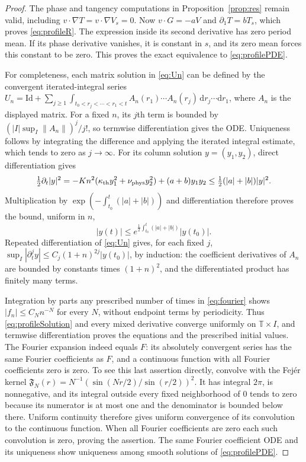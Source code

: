 \documentclass[11pt]{article}
\newcommand{\T}{\mathbb T}
\newcommand{\dd}{\mathrm d}
\newcommand{\thd}{\kappa_{\rm th}}
\newcommand{\vis}{\nu_{\rm phys}}
\begin{document}
\begin{proof}
The phase and tangency computations in Proposition~\ref{prop:res} remain
valid, including $v\cdot\nabla T=v\cdot\nabla V_s=0$.
Now $v\cdot G=-aV$ and $\partial_1T=bT_s$, which proves
\eqref{eq:profileR}. The expression inside its second derivative has zero
period mean. If its phase derivative vanishes, it is constant in $s$,
and its zero mean forces this constant to be zero. This proves the exact
equivalence to \eqref{eq:profilePDE}.

For completeness, each matrix solution in \eqref{eq:Un} can be defined by
the convergent iterated-integral series
$U_n=\mathrm{Id}+\sum_{j\geq1}\int_{t_0<r_j<\cdots<r_1<t}
 A_n(r_1)\cdots A_n(r_j)\,\dd r_j\cdots\dd r_1$, where $A_n$ is the
displayed matrix. For a fixed $n$, its $j$th term is bounded by
$(|I|\sup_I\|A_n\|)^j/j!$, so termwise differentiation gives the ODE.
Uniqueness follows by integrating the difference and applying the
iterated integral estimate, which tends to zero as $j\to\infty$.
For its column solution $y=(y_1,y_2)$, direct differentiation gives
\[
 \tfrac12\partial_t|y|^2
 =-Kn^2(\thd y_1^2+\vis y_2^2)+(a+b)y_1y_2
 \leq \tfrac12(|a|+|b|)|y|^2.
\]
Multiplication by $\exp(-\int_{t_0}^t(|a|+|b|))$ and differentiation
therefore proves the bound, uniform in $n$,
\[
 |y(t)|\leq e^{\frac12\int_{t_0}^t(|a|+|b|)}|y(t_0)|.
\]
Repeated differentiation of \eqref{eq:Un} gives, for each fixed $j$,
$\sup_I|\partial_t^j y|\leq C_j(1+n)^{2j}|y(t_0)|$, by induction:
the coefficient derivatives of $A_n$ are bounded by constants times
$(1+n)^2$, and the differentiated product has finitely many terms.

Integration by parts any prescribed number of times in \eqref{eq:fourier}
shows $|f_n|\leq C_N n^{-N}$ for every $N$, without endpoint terms by
periodicity. Thus \eqref{eq:profileSolution} and every mixed derivative
converge uniformly on $\T\times I$, and termwise differentiation proves
the equations and the prescribed initial values. The Fourier expansion
indeed equals $F$: its absolutely convergent series has the same Fourier
coefficients as $F$, and a continuous function with all Fourier
coefficients zero is zero. To see this last assertion directly, convolve
with the Fej\'er kernel
$\mathfrak F_N(r)=N^{-1}(\sin(Nr/2)/\sin(r/2))^2$.
It has integral $2\pi$, is nonnegative, and its integral outside every
fixed neighborhood of $0$ tends to zero because its numerator is at
most one and the denominator is bounded below there. Uniform continuity
therefore gives uniform convergence of its convolution to the continuous
function. When all Fourier coefficients are zero each such convolution
is zero, proving the assertion. The same Fourier coefficient ODE and
its uniqueness show uniqueness among smooth solutions of
\eqref{eq:profilePDE}.
\end{proof}
\end{document}
